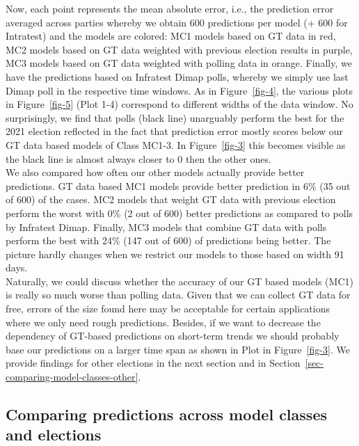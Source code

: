\documentclass[
  letterpaper,
  DIV=11,
  numbers=noendperiod]{scrartcl}
\begin{document}
Now, each point represents the mean absolute error, i.e., the prediction
error averaged across parties whereby we obtain 600 predictions per
model (+ 600 for Intratest) and the models are colored: MC1 models based
on GT data in red, MC2 models based on GT data weighted with previous
election results in purple, MC3 models based on GT data weighted with
polling data in orange. Finally, we have the predictions based on
Infratest Dimap polls, whereby we simply use last Dimap poll in the
respective time windows. As in Figure~\ref{fig-4}, the various plots in
Figure~\ref{fig-5} (Plot 1-4) correspond to different widths of the data
window. No surprisingly, we find that polls (black line) unarguably
perform the best for the 2021 election reflected in the fact that
prediction error mostly scores below our GT data based models of Class
MC1-3. In Figure~\ref{fig-3} this becomes visible as the black line is
almost always closer to 0 then the other ones.\\
We also compared how often our other models actually provide better
predictions. GT data based MC1 models provide better prediction in 6\%
(35 out of 600) of the cases. MC2 models that weight GT data with
previous election perform the worst with 0\% (2 out of 600) better
predictions as compared to polls by Infratest Dimap. Finally, MC3 models
that combine GT data with polls perform the best with 24\% (147 out of
600) of predictions being better. The picture hardly changes when we
restrict our models to those based on width 91 days.\\
Naturally, we could discuss whether the accuracy of our GT based models
(MC1) is really so much worse than polling data. Given that we can
collect GT data for free, errors of the size found here may be
acceptable for certain applications where we only need rough
predictions. Besides, if we want to decrease the dependency of GT-based
predictions on short-term trends we should probably base our predictions
on a larger time span as shown in Plot in Figure~\ref{fig-3}. We provide
findings for other elections in the next section and in
Section~\ref{sec-comparing-model-classes-other}.

\hypertarget{comparing-predictions-across-model-classes-and-elections}{%
\subsection{Comparing predictions across model classes and
elections}\label{comparing-predictions-across-model-classes-and-elections}}
\end{document}
